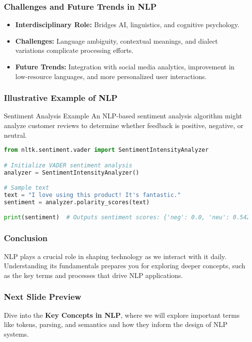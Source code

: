 \documentclass[aspectratio=169]{beamer}
\begin{document}
\begin{frame}[fragile]
    \frametitle{Challenges and Future Trends in NLP}
    \begin{itemize}
        \item \textbf{Interdisciplinary Role:} Bridges AI, linguistics, and cognitive psychology.
        \item \textbf{Challenges:} Language ambiguity, contextual meanings, and dialect variations complicate processing efforts.
        \item \textbf{Future Trends:} Integration with social media analytics, improvement in low-resource languages, and more personalized user interactions.
    \end{itemize}
\end{frame}

\begin{frame}[fragile]
    \frametitle{Illustrative Example of NLP}
    \begin{block}{Sentiment Analysis Example}
        An NLP-based sentiment analysis algorithm might analyze customer reviews to determine whether feedback is positive, negative, or neutral.
    \end{block}
    \begin{lstlisting}[language=Python]
from nltk.sentiment.vader import SentimentIntensityAnalyzer

# Initialize VADER sentiment analysis
analyzer = SentimentIntensityAnalyzer()

# Sample text
text = "I love using this product! It's fantastic."
sentiment = analyzer.polarity_scores(text)

print(sentiment)  # Outputs sentiment scores: {'neg': 0.0, 'neu': 0.542, 'pos': 0.458, 'compound': 0.839}
    \end{lstlisting}
\end{frame}

\begin{frame}[fragile]
    \frametitle{Conclusion}
    NLP plays a crucial role in shaping technology as we interact with it daily. Understanding its fundamentals prepares you for exploring deeper concepts, such as the key terms and processes that drive NLP applications.
\end{frame}

\begin{frame}[fragile]
    \frametitle{Next Slide Preview}
    Dive into the \textbf{Key Concepts in NLP}, where we will explore important terms like tokens, parsing, and semantics and how they inform the design of NLP systems.
\end{frame}
\end{document}
